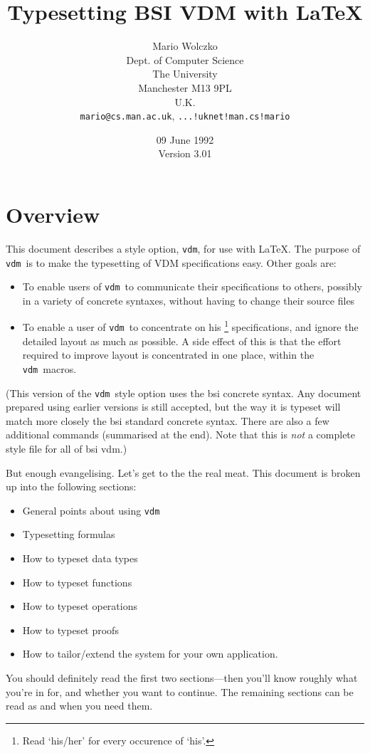 \documentclass{article}
\title{Typesetting BSI VDM with \LaTeX}
\author{Mario Wolczko\\
Dept. of Computer Science\\
The University\\
Manchester M13 9PL\\
U.K.\\
\texttt{mario@cs.man.ac.uk}, {\tt ...!uknet!man.cs!mario}}
\date{09 June 1992 \\
Version 3.01}
\newcommand{\Vdm}{{\tt vdm\/}}
\renewcommand{\^}[1]{$\langle${\rm #1\/}$\rangle$}
\begin{document}
\maketitle

\tableofcontents

\section{Overview}

This document describes a style option, \Vdm, for use with
\LaTeX.  The purpose of \Vdm\ is to make the typesetting of VDM
specifications easy.  Other goals are:
\begin{itemize}
\item   To enable users of \Vdm\ to communicate their specifications
        to others, possibly in a variety of concrete syntaxes, without
        having to change their source files
\item   To enable a user of \Vdm\ to concentrate on his%
        \footnote{Read `his/her' for every occurence of `his'.}
        specifications, and ignore the detailed layout as much as
        possible.  A side effect of this is that the effort required
        to improve layout is concentrated in one place, within the
        \Vdm\ macros.
\end{itemize}
(This version of the \Vdm\ style option uses the {\sc bsi} concrete
syntax.  Any document prepared using earlier versions is still
accepted, but the way it is typeset will match more closely the {\sc
bsi} standard concrete syntax.  There are also a few additional
commands (summarised at the end).  Note that this is {\em not\/} a
complete style file for all of {\sc bsi vdm}.)

But enough evangelising.  Let's get to the the real meat.  This
document is broken up into the following sections:
\begin{itemize}
\item   General points about using \Vdm
\item   Typesetting formulas
\item   How to typeset data types
\item   How to typeset functions
\item   How to typeset operations
\item   How to typeset proofs
\item   How to tailor/extend the system for your own
        application.
\end{itemize}
You should definitely read the first two sections---then you'll know
roughly what you're in for, and whether you want to continue.  The
remaining sections can be read as and when you need them.
\end{document}
